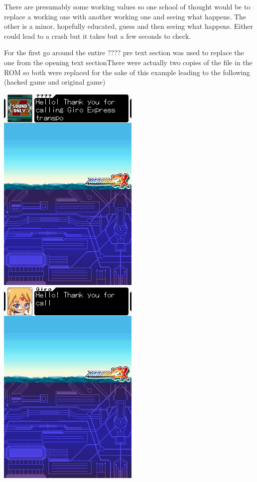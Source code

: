 \documentclass[
]{book}
\begin{document}
There are presumably some working values so one school of thought would be to replace a working one with another working one and seeing what happens. The other is a minor, hopefully educated, guess and then seeing what happens. Either could lead to a crash but it takes but a few seconds to check.

For the first go around the entire ???? pre text section was used to replace the one from the opening text sectionThere were actually two copies of the file in the ROM so both were replaced for the sake of this example leading to the following (hacked game and original game)

\includegraphics{images/106_home_fast6191_romhackingguide_unrenamed_fil___iginal_borders_romhackingguidemarkupexedit1.png}\includegraphics{images/107_home_fast6191_romhackingguide_unrenamed_fil___iginal_borders_romhackingguidemarkupexedit2.png}
\end{document}
